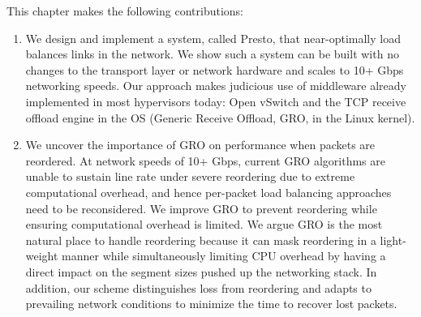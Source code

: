 
This chapter makes the following contributions:
\begin{enumerate}

\item We design and implement a system, called Presto, that near-optimally load balances
links in the network. We show such a system can be built with no changes to the transport
layer or network hardware and scales to 10+ Gbps networking speeds.
Our approach makes judicious use of middleware
already implemented in most hypervisors today: Open vSwitch and the TCP receive offload engine in the OS
(Generic Receive Offload, GRO, in the Linux kernel).

\item We uncover the importance of GRO on performance when packets are reordered.
At network speeds of 10+ Gbps, current GRO algorithms are unable to sustain line rate under 
severe reordering due to extreme computational overhead, and hence 
per-packet load balancing approaches~\cite{drb,packetspray} need to be reconsidered. We
improve GRO to prevent reordering while ensuring computational overhead is limited.
We argue
GRO is the most natural place to handle reordering because it can mask
reordering in a light-weight manner while simultaneously limiting CPU overhead by having a direct impact
on the segment sizes pushed up the networking stack.
In addition, our scheme distinguishes loss from reordering and adapts to prevailing network conditions
to minimize the time to recover lost packets.


\end{enumerate}
